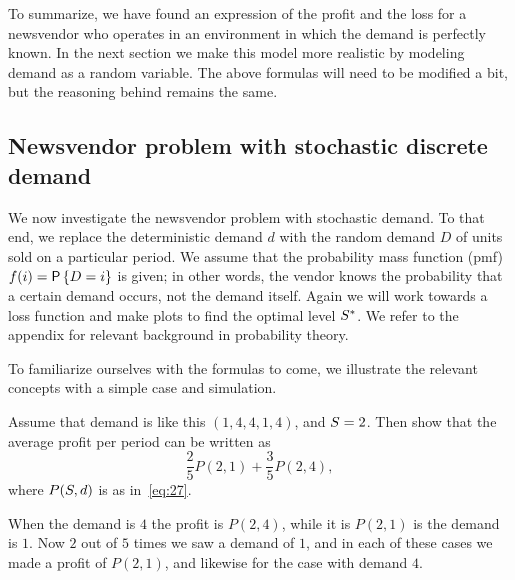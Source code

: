 To summarize, we have found an expression of the profit and the loss for a newsvendor who operates in an environment in which the demand is perfectly known. In the next section we make this model more realistic by modeling demand as a random variable. The above formulas will need to be modified a bit, but the reasoning behind remains the same. 

\subsection{Newsvendor problem with stochastic discrete demand}
\label{sec:stoch-discr-demand}

We now investigate the newsvendor problem with stochastic demand. To that end, we replace the deterministic demand $d$ with  the random demand $D$  of units sold on a particular period. We assume that the probability mass function (pmf) $f(i) = \P{ D = i}$ is given; in other words, the vendor knows the probability that a certain demand occurs, not the demand itself.  Again we will work towards a loss function and make plots to find the optimal level $S^*$. We refer to the appendix for relevant background in probability theory.


To familiarize ourselves with the formulas to come, we illustrate the relevant concepts with a simple case and simulation. 
\begin{exercise}\label{ex:9}
Assume that demand is like this $(1, 4, 4, 1, 4)$, and $S = 2$. Then show that the average profit per period can be written as
\begin{equation*}
\frac 2 5 P(2, 1) + \frac 3 5 P(2, 4),
\end{equation*}
where $P(S, d)$ is as in~\eqref{eq:27}. 
\begin{solution}
  When the demand is $4$ the profit is $P(2, 4)$, while it is $P(2, 1)$ is the demand is $1$. Now $2$ out of $5$ times we saw a demand of $1$, and in each of these cases we made a profit of $P(2, 1)$, and likewise for the case with demand $4$. 
\end{solution}
\end{exercise}

